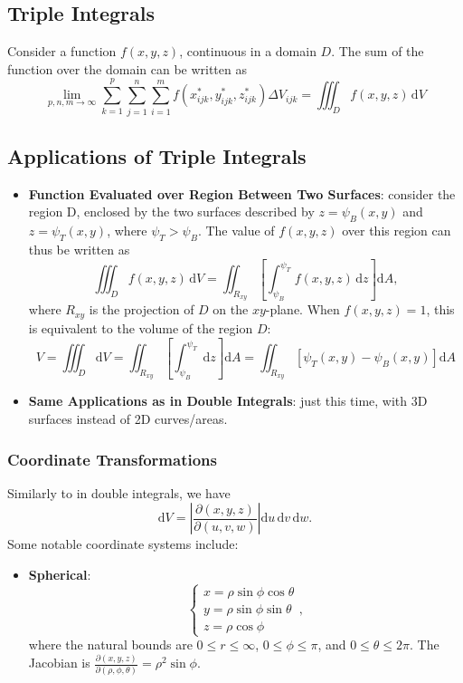 \documentclass[12pt]{article}
\begin{document}
{\subsection{Triple Integrals}

Consider a function $f(x,y,z)$, continuous in a domain $D$. The sum of the function over the domain can be written as \[\lim_{p,n,m \to \infty} \sum_{k=1}^p \sum_{j=1}^n \sum_{i=1}^m f(x_{ijk}^*, y_{ijk}^*, z_{ijk}^*) \Delta V_{ijk} = \iiint_D f(x,y,z) \,\text{d}V\]


\subsection{Applications of Triple Integrals}
\begin{itemize}
    \item \textbf{Function Evaluated over Region Between Two Surfaces}: consider the region D, enclosed by the two surfaces described by $z = \psi_B(x,y)$ and $z = \psi_T(x,y)$, where $\psi_T > \psi_B$. The value of $f(x,y,z)$ over this region can thus be written as \[\iiint_D f(x,y,z) \,\text{d}V = \iint_{R_{xy}} \left[\int_{\psi_B}^{\psi_T} f(x,y,z) \, \text{d}z\right]\text{d}A,\] where $R_{xy}$ is the projection of $D$ on the $xy$-plane. When $f(x,y,z) = 1$, this is equivalent to the volume of the region $D$: \[V = \iiint_D \text{d}V = \iint_{R_{xy}}\left[\int_{\psi_B}^{\psi_T} \,\text{d}z\right] \text{d}A = \iint_{R_{xy}}\left[\psi_T(x,y) - \psi_B(x,y)\right]\text{d}A\]
    \item \textbf{Same Applications as in Double Integrals}: just this time, with 3D surfaces instead of 2D curves/areas.
\end{itemize}

\subsubsection{Coordinate Transformations}

Similarly to in double integrals, we have \[\text{d}V = \left|\frac{\partial(x,y,z)}{\partial(u,v,w)}\right| \text{d}u\, \text{d}v\, \text{d}w.\] Some notable coordinate systems include: \begin{itemize}
    \item \textbf{Spherical}: \[\begin{cases}
        x = \rho\sin\phi\cos\theta\\
        y = \rho\sin\phi\sin\theta\\
        z = \rho\cos\phi
    \end{cases},\] where the natural bounds are $0 \leq r \leq \infty$, $0 \leq \phi \leq \pi$, and $0 \leq \theta \leq 2\pi$. The Jacobian is $\frac{\partial(x,y,z)}{\partial(\rho, \phi, \theta)} = \rho^2\sin \phi$.


\end{itemize}}
\end{document}
